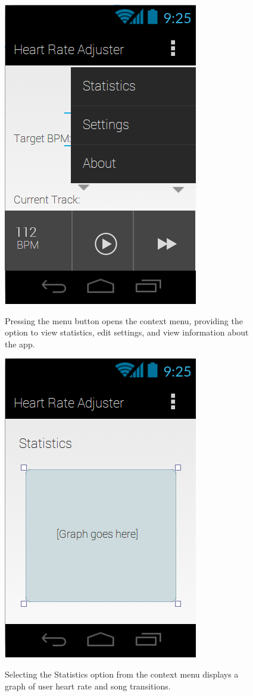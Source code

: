 \documentclass[letterpaper,english, 12pt]{scrreprt}
\begin{document}
\begin{figure}[H]
	\centering
	\includegraphics{img/mobile_ui/3.png}\\
	\caption{Pressing the menu button opens the context menu, providing the option to view statistics, edit settings, and view information about the app.}
\end{figure}

\begin{figure}[H]
	\centering
	\includegraphics{img/mobile_ui/7.png}\\
	\caption{Selecting the Statistics option from the context menu displays a graph of user heart rate and song transitions.}
\end{figure}
\end{document}
